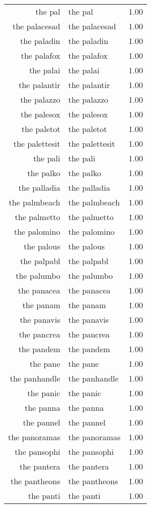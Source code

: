 \begin{table}[ht]
\begin{tabular}{rlr}
  the pal & the pal & 1.00 \\ 
  the palacesad & the palacesad & 1.00 \\ 
  the paladin & the paladin & 1.00 \\ 
  the palafox & the palafox & 1.00 \\ 
  the palai & the palai & 1.00 \\ 
  the palantir & the palantir & 1.00 \\ 
  the palazzo & the palazzo & 1.00 \\ 
  the palesox & the palesox & 1.00 \\ 
  the paletot & the paletot & 1.00 \\ 
  the palettesit & the palettesit & 1.00 \\ 
  the pali & the pali & 1.00 \\ 
  the palko & the palko & 1.00 \\ 
  the palladia & the palladia & 1.00 \\ 
  the palmbeach & the palmbeach & 1.00 \\ 
  the palmetto & the palmetto & 1.00 \\ 
  the palomino & the palomino & 1.00 \\ 
  the palous & the palous & 1.00 \\ 
  the palpabl & the palpabl & 1.00 \\ 
  the palumbo & the palumbo & 1.00 \\ 
  the panacea & the panacea & 1.00 \\ 
  the panam & the panam & 1.00 \\ 
  the panavis & the panavis & 1.00 \\ 
  the pancrea & the pancrea & 1.00 \\ 
  the pandem & the pandem & 1.00 \\ 
  the pane & the pane & 1.00 \\ 
  the panhandle & the panhandle & 1.00 \\ 
  the panic & the panic & 1.00 \\ 
  the panna & the panna & 1.00 \\ 
  the pannel & the pannel & 1.00 \\ 
  the panoramas & the panoramas & 1.00 \\ 
  the pansophi & the pansophi & 1.00 \\ 
  the pantera & the pantera & 1.00 \\ 
  the pantheons & the pantheons & 1.00 \\ 
  the panti & the panti & 1.00 \\ 

\end{tabular}
\end{table}
